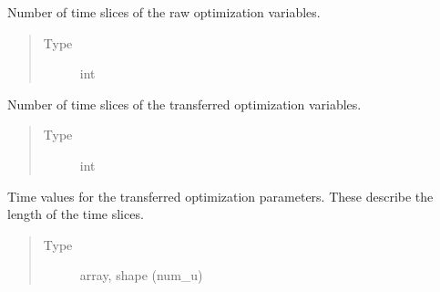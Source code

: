 \documentclass[letterpaper,10pt,english]{sphinxmanual}
\begin{document}
\begin{fulllineitems}
\begin{fulllineitems}
\label{\detokenize{qsim:qsim.transfer_function.TransferFunction._num_y}}
Number of time slices of the raw optimization variables.
\begin{quote}\begin{description}
\item[{Type}] \leavevmode
int

\end{description}\end{quote}

\end{fulllineitems}


\begin{fulllineitems}
\label{\detokenize{qsim:qsim.transfer_function.TransferFunction._num_x}}
Number of time slices of the transferred optimization variables.
\begin{quote}\begin{description}
\item[{Type}] \leavevmode
int

\end{description}\end{quote}

\end{fulllineitems}


\begin{fulllineitems}
\label{\detokenize{qsim:qsim.transfer_function.TransferFunction._x_times}}
Time values for the transferred optimization parameters. These
describe the length of the time slices.
\begin{quote}\begin{description}
\item[{Type}] \leavevmode
array, shape (num\_u)

\end{description}\end{quote}

\end{fulllineitems}



\end{fulllineitems}
\end{document}

